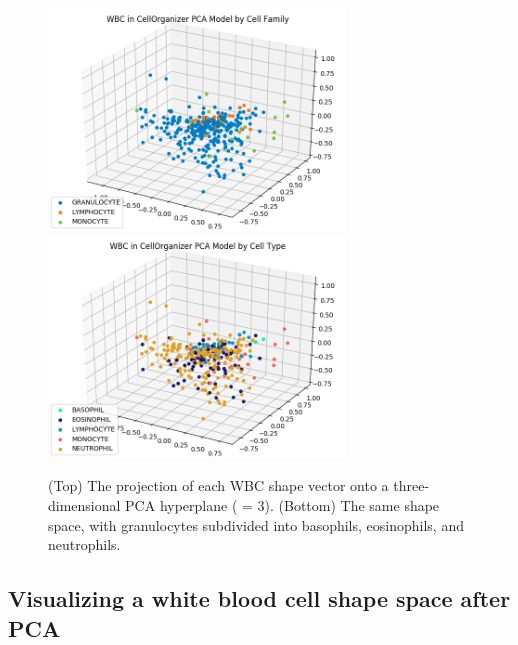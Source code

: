 \begin{figure}[p]
\centering
\mySfFamily
\includegraphics[width = 0.7\textwidth]{../images/cellorg_pca_graph.png}\\[4ex]
\includegraphics[width = 0.7\textwidth]{../images/cellorg_pca_graph_cell.png}
\caption{(Top) The projection of each WBC shape vector onto a three-dimensional PCA hyperplane ( = 3). (Bottom) The same shape space, with granulocytes subdivided into basophils, eosinophils, and neutrophils.}
\label{fig:cellorg_pca_graph}
\end{figure}

\begin{note}[%
It can be proven that for any dataset, when $d_1$ is smaller than $d_2$, the hyperplane provided by PCA of dimension $d_1$ is \textit{always} a subset of the hyperplane of dimension $d_2$. For example, the first principal component is always found within the plane ($d = 2$) provided by PCA, as indicated in \autoref{fig:three_dimensional_pca} (left).
]\end{note}

\FloatBarrier
{}
\subsection{Visualizing a white blood cell shape space after PCA}

